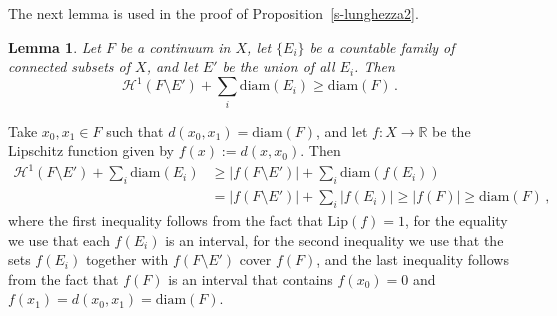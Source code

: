 \documentclass[11pt,reqno,a4paper,final]{amsart}
\makeatletter
\numberwithin{equation}{section}
\theoremstyle{mytheorem}
\newtheorem{lemma}[subsection]{Lemma}
\theoremstyle{myremark}
\theoremstyle{myparagraph}
\renewenvironment{proof}[1][\proofname]{\par 
  \pushQED{\qed}%
  \normalfont \topsep10\p@\@plus6\p@\relax 
  \trivlist 
  \item[\hskip\labelsep 
    \bfseries 
    #1\@addpunct{.}]\ignorespaces 
}{%
  \popQED\endtrivlist\@endpefalse 
}
\providecommand{\proofname}{Proof}
\newcommand{\R}{\mathbb{R}}
\newcommand{\Haus}{\mathscr{H}}
\newcommand{\diam}{\mathrm{diam}}
\newcommand{\Lip}{\mathrm{Lip}}
\makeatother
\begin{document}
The next lemma is used in the proof of Proposition~\ref{s-lunghezza2}.


\begin{lemma}
\label{s-deltapartitions2}
Let $F$ be a continuum in $X$,
let $\{E_i\}$ be a countable family of connected 
subsets of $X$, and let $E'$ be the union of all $E_i$.
Then
\[
\Haus^1(F\setminus E') + \sum_i \diam(E_i) \ge \diam(F)
\, .
\]
\end{lemma}

\begin{proof}
Take $x_0,x_1\in F$ such that $d(x_0,x_1)=\diam(F)$, 
and let $f:X\to\R$ be the Lipschitz function given by $f(x):=d(x,x_0)$. 
Then
%
\begin{align*}
  \Haus^1(F\setminus E') + \sum_i \diam(E_i) 
& \ge |f(F\setminus E')| + \sum_i \diam(f(E_i)) \\
&   = |f(F\setminus E')| + \sum_i |f(E_i)| 
  \ge |f(F)|
  \ge \diam(F)
  \, ,
\end{align*}
%
where the first inequality follows from the fact that $\Lip(f)=1$, 
for the equality we use that each $f(E_i)$ is an
interval, for the second inequality we use that 
the sets $f(E_i)$ together with $f(F\setminus E')$ cover
$f(F)$, and the last inequality follows from the fact that 
$f(F)$ is an interval that contains $f(x_0)=0$
and $f(x_1)=d(x_0,x_1)=\diam(F)$.
\end{proof}
\end{document}
